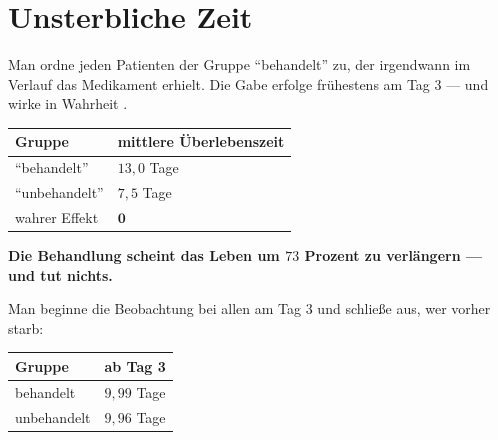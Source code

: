 \section{Unsterbliche Zeit}

\begin{warnung}
Man ordne jeden Patienten der Gruppe \enquote{behandelt} zu, der irgendwann im Verlauf das Medikament erhielt. Die Gabe erfolge frühestens am Tag $3$ --- und wirke in Wahrheit .

\begin{center}
{\small
\renewcommand{\arraystretch}{1.5}
\begin{tabular}{@{}P{3.0cm}P{2.8cm}@{}}
\toprule
\textbf{Gruppe} & \textbf{mittlere Überlebenszeit}\\
\midrule
\enquote{behandelt} & $13{,}0$ Tage\\
\enquote{unbehandelt} & $7{,}5$ Tage\\
\midrule
wahrer Effekt & $\mathbf{0}$\\
\bottomrule
\end{tabular}}
\end{center}

\begin{center}
\begin{minipage}{0.9\textwidth}
\textbf{Die Behandlung scheint das Leben um $73$ Prozent zu verlängern --- und tut nichts.}
\end{minipage}
\end{center}

\begin{center}
\begin{minipage}{0.88\textwidth}
\end{minipage}
\end{center}

Man beginne die Beobachtung bei allen am Tag $3$ und schließe aus, wer vorher starb:
\begin{center}
{\small
\renewcommand{\arraystretch}{1.48}
\begin{tabular}{@{}P{3.0cm}P{2.8cm}@{}}
\toprule
\textbf{Gruppe} & \textbf{ab Tag 3}\\
\midrule
behandelt & $9{,}99$ Tage\\
unbehandelt & $9{,}96$ Tage\\
\bottomrule
\end{tabular}}
\end{center}


\end{warnung}
